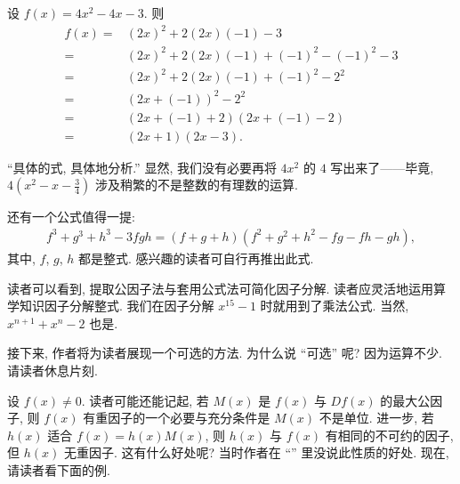 \begin{example}
    设 $f(x) = 4x^2 - 4x - 3$. 则
    \begin{align*}
        f(x)
        = {} & (2x)^2 + 2 (2x) (-1) - 3                   \\
        = {} & (2x)^2 + 2 (2x) (-1) + (-1)^2 - (-1)^2 - 3 \\
        = {} & (2x)^2 + 2 (2x) (-1) + (-1)^2 - 2^2        \\
        = {} & (2x + (-1))^2 - 2^2                        \\
        = {} & (2x + (-1) + 2) (2x + (-1) - 2)            \\
        = {} & (2x + 1) (2x - 3).
    \end{align*}

    ``具体的式, 具体地分析.'' 显然, 我们没有必要再将 $4x^2$ 的 $4$ 写出来了——毕竟, $4 \left(x^2 - x - \frac{3}{4} \right)$ 涉及稍繁的不是整数的有理数的运算.
\end{example}

还有一个公式值得一提:
\begin{align*}
    f^3 + g^3 + h^3 - 3fgh = (f + g + h)(f^2 + g^2 + h^2 - fg - fh - gh),
\end{align*}
其中, $f$, $g$, $h$ 都是整式. 感兴趣的读者可自行再推出此式.

读者可以看到, 提取公因子法与套用公式法可简化因子分解. 读者应灵活地运用算学知识因子分解整式. 我们在因子分解 $x^{15} - 1$ 时就用到了乘法公式. 当然, $x^{n+1} + x^n - 2$ 也是.

接下来, 作者将为读者展现一个可选的方法. 为什么说 ``可选'' 呢? 因为运算不少. 请读者休息片刻.

\myLine

设 $f(x) \neq 0$. 读者可能还能记起, 若 $M(x)$ 是 $f(x)$ 与 $Df(x)$ 的最大公因子, 则 $f(x)$ 有重因子的一个必要与充分条件是 $M(x)$ 不是单位. 进一步, 若 $h(x)$ 适合 $f(x) = h(x)M(x)$, 则 $h(x)$ 与 $f(x)$ 有相同的不可约的因子, 但 $h(x)$ 无重因子. 这有什么好处呢? 当时作者在 ``\MultipleFactors '' 里没说此性质的好处. 现在, 请读者看下面的例.

